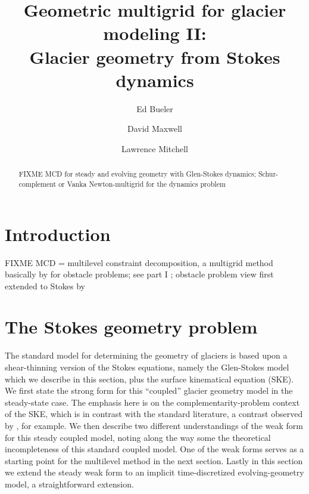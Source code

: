 \documentclass[letterpaper,final,12pt,reqno]{amsart}
\theoremstyle{claim}
\numberwithin{equation}{section}
\numberwithin{figure}{section}
\numberwithin{table}{section}
\numberwithin{theorem}{section}
\begin{document}
\title[Geometric multigrid for glacier modeling II]{Geometric multigrid for glacier modeling II: \\ Glacier geometry from Stokes dynamics}

\author{Ed Bueler}

\author{David Maxwell}

\author{Lawrence Mitchell}

\begin{abstract} FIXME MCD for steady and evolving geometry with Glen-Stokes dynamics; Schur-complement or Vanka Newton-multigrid for the dynamics problem
\end{abstract}

\maketitle

\tableofcontents

\thispagestyle{empty}

\section{Introduction} \label{sec:intro}

FIXME MCD = multilevel constraint decomposition, a multigrid \cite{Trottenbergetal2001} method basically by \cite{Tai2003} for obstacle problems; see part I \cite{Bueler2022partI};  obstacle problem view first extended to Stokes by \cite{WirbelJarosch2020}


\section{The Stokes geometry problem} \label{sec:stokesgeometry}

The standard model for determining the geometry of glaciers is based upon a shear-thinning version of the Stokes equations, namely the Glen-Stokes model which we describe in this section, plus the surface kinematical equation (SKE).  We first state the strong form for this ``coupled'' glacier geometry model in the steady-state case.  The emphasis here is on the complementarity-problem context of the SKE, which is in contrast with the standard literature, a contrast observed by \cite{SchoofHewitt2013}, for example.  We then describe two different understandings of the weak form for this steady coupled model, noting along the way some the theoretical incompleteness of this standard coupled model.  One of the weak forms serves as a starting point for the multilevel method in the next section.  Lastly in this section we extend the steady weak form to an implicit time-discretized  evolving-geometry model, a straightforward extension.
\end{document}
